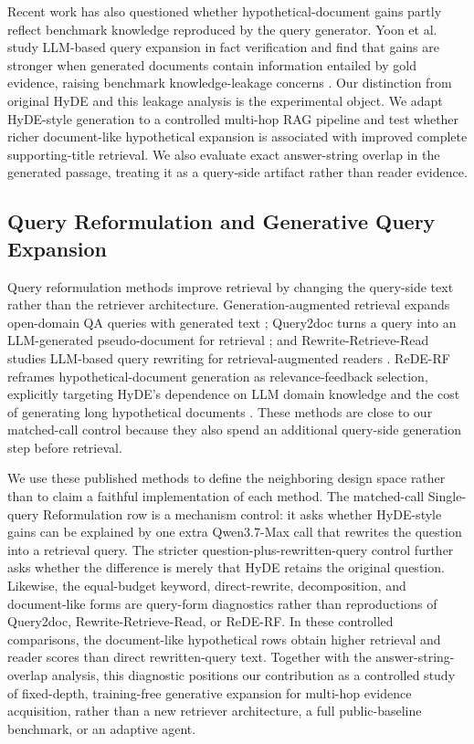 Recent work has also questioned whether hypothetical-document gains partly reflect benchmark knowledge reproduced by the query generator. Yoon et al. study LLM-based query expansion in fact verification and find that gains are stronger when generated documents contain information entailed by gold evidence, raising benchmark knowledge-leakage concerns \cite{yoon2025knowledgeleakage}. Our distinction from original HyDE and this leakage analysis is the experimental object. We adapt HyDE-style generation to a controlled multi-hop RAG pipeline and test whether richer document-like hypothetical expansion is associated with improved complete supporting-title retrieval. We also evaluate exact answer-string overlap in the generated passage, treating it as a query-side artifact rather than reader evidence.

\subsection{Query Reformulation and Generative Query Expansion}
\label{sec:rw_query_reformulation}

Query reformulation methods improve retrieval by changing the query-side text rather than the retriever architecture. Generation-augmented retrieval expands open-domain QA queries with generated text \cite{mao2020gar}; Query2doc turns a query into an LLM-generated pseudo-document for retrieval \cite{wang2023query2doc}; and Rewrite-Retrieve-Read studies LLM-based query rewriting for retrieval-augmented readers \cite{ma2023rewrite}. ReDE-RF reframes hypothetical-document generation as relevance-feedback selection, explicitly targeting HyDE's dependence on LLM domain knowledge and the cost of generating long hypothetical documents \cite{jedidi2024rederf}. These methods are close to our matched-call control because they also spend an additional query-side generation step before retrieval.

We use these published methods to define the neighboring design space rather than to claim a faithful implementation of each method. The matched-call Single-query Reformulation row is a mechanism control: it asks whether HyDE-style gains can be explained by one extra Qwen3.7-Max call that rewrites the question into a retrieval query. The stricter question-plus-rewritten-query control further asks whether the difference is merely that HyDE retains the original question. Likewise, the equal-budget keyword, direct-rewrite, decomposition, and document-like forms are query-form diagnostics rather than reproductions of Query2doc, Rewrite-Retrieve-Read, or ReDE-RF. In these controlled comparisons, the document-like hypothetical rows obtain higher retrieval and reader scores than direct rewritten-query text. Together with the answer-string-overlap analysis, this diagnostic positions our contribution as a controlled study of fixed-depth, training-free generative expansion for multi-hop evidence acquisition, rather than a new retriever architecture, a full public-baseline benchmark, or an adaptive agent.

